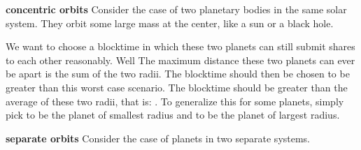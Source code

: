 \documentclass[conference]{IEEEtran}
\begin{document}
\textbf{concentric orbits}
Consider the case of two planetary bodies in the same solar system. They orbit some large mass at the center, like a sun or a black hole. 
\begin{center}
\end{center}


We want to choose a blocktime in which these two planets can still submit shares to each other reasonably. Well The maximum distance these two planets can ever be apart is the sum of the two radii. The blocktime should then be chosen to be greater than this worst case scenario. The blocktime should be greater than the average of these two radii, that is: . To generalize this for some  planets, simply pick  to be the planet of smallest radius and  to be the planet of largest radius.

\textbf{separate orbits}
Consider the case of planets in two separate systems.
\begin{center}
\end{center}
\end{document}
